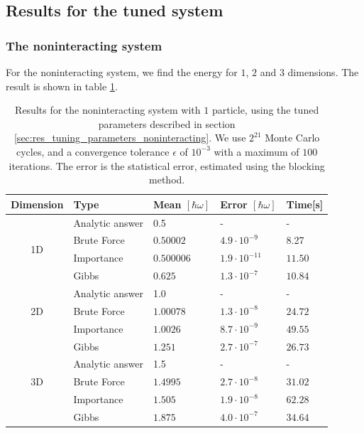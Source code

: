 \documentclass[a4paper, 10pt]{article}
\begin{document}
\subsection{Results for the tuned system}
\subsubsection{The noninteracting system}
For the noninteracting system, we find the energy for $1$, $2$ and $3$ dimensions. The result is shown in table \ref{tab:noninteracting_results}.
\begin{table}[ht!]
	\centering
	\caption{Results for the noninteracting system with $1$ particle, using the tuned parameters described in section \ref{sec:res_tuning_parameters_noninteracting}. We use $2^{21}$ Monte Carlo cycles, and a convergence tolerance $\epsilon$ of $10^{-3}$ with a maximum of $100$ iterations. The error is the statistical error, estimated using the blocking method.}
	\label{tab:noninteracting_results}
	\begin{tabular}{c|l|l|l|l|}
		\multicolumn{1}{l}{Dimension} & Type        & Mean $[\hbar \omega]$ & Error $[\hbar \omega]$ & Time{[}s{]} \\
		\hline
		\multirow{4}{*}{1D}       		&Analytic answer & 0.5&-&-\\    
		& Brute Force & $0.50002$               & $4.9\cdot 10^{-9}$     & 8.27        \\
		& Importance  & $0.500006$              & $1.9\cdot 10^{-11}$                  & $11.50$       \\
		& Gibbs       & $0.625$                 & $1.3\cdot 10^{-7}$                  & $10.84$       \\
		\hline
		\multirow{3}{*}{2D}   &Analytic answer & 1.0&- &-\\
		& Brute Force & $1.00078$               & $1.3\cdot 10^{-8}$                  & $24.72$       \\
		& Importance  & $1.0026$                & $8.7\cdot 10^{-9}$                  & $49.55$       \\
		& Gibbs       & $1.251$                 & $2.7\cdot 10^{-7}$                  & $26.73$       \\
		\hline
		\multirow{3}{*}{3D}   &Analytic answer & 1.5 & - & -\\
		         & Brute Force & $1.4995$                & $2.7\cdot 10^{-8}$                  & $31.02$       \\
		& Importance  & $1.505$                & $1.9\cdot 10^{-8}$                  & $62.28$       \\
		& Gibbs       & $1.875$                 & $4.0\cdot 10^{-7}$                  & $34.64$      
	\end{tabular}
\end{table}
\end{document}
